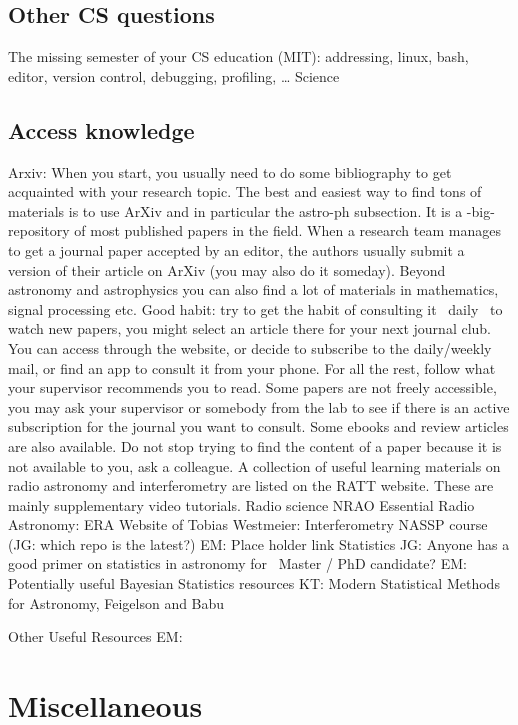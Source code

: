 \subsection{Other CS questions}
The missing semester of your CS education (MIT): addressing, linux, bash, editor, version control, debugging, profiling, …
Science

\subsection{Access knowledge}
Arxiv: When you start, you usually need to do some bibliography to get acquainted with your research topic. The best and easiest way to find tons of materials is to use ArXiv and in particular the astro-ph subsection. It is a -big- repository of most published papers in the field. When a research team manages to get a journal paper accepted by an editor, the authors usually submit a version of their article on ArXiv (you may also do it someday). Beyond astronomy and astrophysics you can also find a lot of materials in mathematics, signal processing etc.
Good habit: try to get the habit of consulting it ~daily~ to watch new papers, you might select an article there for your next journal club. You can access through the website, or decide to subscribe to the daily/weekly mail, or find an app to consult it from your phone.
For all the rest, follow what your supervisor recommends you to read. Some papers are not freely accessible, you may ask your supervisor or somebody from the lab to see if there is an active subscription for the journal you want to consult. Some ebooks and review articles are also available. Do not stop trying to find the content of a paper because it is not available to you, ask a colleague.
A collection of useful learning materials on radio astronomy and interferometry are listed on the RATT website. These are mainly supplementary video tutorials.
Radio science
NRAO Essential Radio Astronomy: ERA
Website of Tobias Westmeier: 
Interferometry
NASSP course (JG: which repo is the latest?) EM: Place holder link
Statistics
JG: Anyone has a good primer on statistics in astronomy for ~Master / PhD candidate?
EM: Potentially useful Bayesian Statistics resources
KT: Modern Statistical Methods for Astronomy, Feigelson and Babu

Other Useful Resources
EM: 

\section{Miscellaneous}
